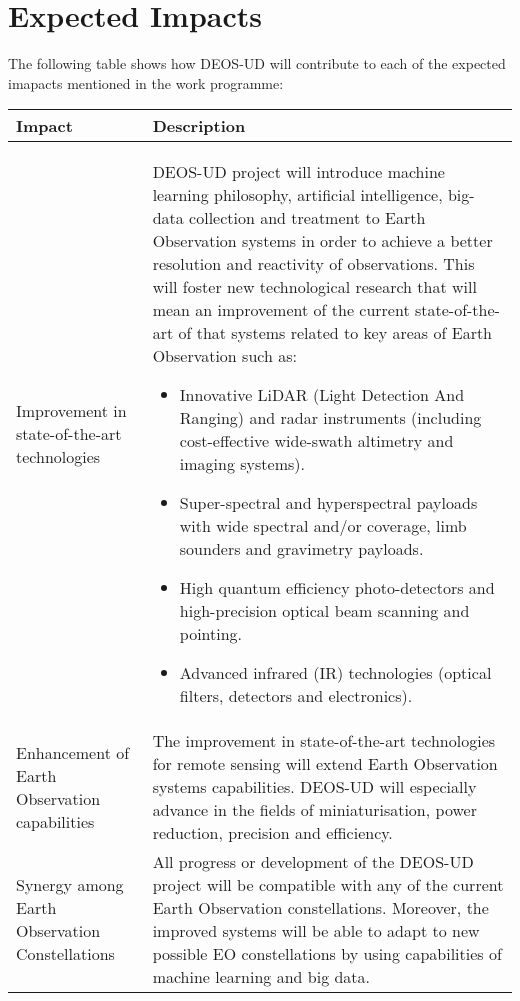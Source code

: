 \section{Expected Impacts}

The following table shows how DEOS-UD will contribute to each of the expected imapacts mentioned in the work programme:

\begin{longtable}{>{\raggedright\arraybackslash}p{3cm} p{11cm}}
	
	\toprule[2pt]
	
	\textbf{Impact} &  \textbf{Description}\\
	
	\midrule [1.5pt]
	\endhead
	
	Improvement in state-of-the-art technologies & DEOS-UD project will introduce machine learning philosophy, artificial intelligence, big-data collection and treatment to Earth Observation systems in order to achieve a better resolution and reactivity of observations. This will foster new technological research that will mean an improvement of the current state-of-the-art of that systems related to key areas of Earth Observation such as: 
	\begin{itemize}  
		\item Innovative LiDAR (Light Detection And Ranging) and radar instruments (including cost-effective wide-swath altimetry and imaging systems).
		\item Super-spectral and hyperspectral payloads with wide spectral and/or coverage, limb sounders and gravimetry payloads.
		\item High quantum efficiency photo-detectors and high-precision optical beam scanning and pointing.
		\item Advanced infrared (IR) technologies (optical filters, detectors and electronics).
	\end{itemize}\\
	
	\midrule
	
	Enhancement of Earth Observation capabilities & The improvement in state-of-the-art technologies for remote sensing will extend Earth Observation systems capabilities. DEOS-UD will especially advance in the fields of miniaturisation, power reduction, precision and efficiency.\vspace{0.2cm}\\
	
	\midrule
	
	Synergy among Earth Observation Constellations & All progress or development of the DEOS-UD project will be compatible with any of the current Earth Observation constellations. Moreover, the improved systems will be able to adapt to new possible EO constellations by using capabilities of machine learning and big data.\vspace{0.2cm}\\
	

\end{longtable}

